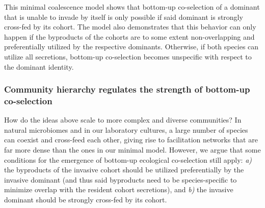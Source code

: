 \documentclass[a4paper,10pt]{article}
\begin{document}
This minimal coalescence model shows that
bottom-up co-selection of a dominant that is unable to invade by itself
is only possible if said dominant is strongly cross-fed by its cohort.
The model also demonstrates that this behavior can only happen
if the byproducts of the cohorts are to some extent non-overlapping
and preferentially utilized by the respective dominants.
Otherwise, if both species can utilize all secretions, bottom-up
co-selection becomes unspecific with respect to the dominant identity.

\subsubsection*{Community hierarchy regulates the strength of bottom-up co-selection}

How do the ideas above scale to more complex and diverse communities?
In natural microbiomes and in our laboratory cultures,
a large number of species can coexist and cross-feed each other,
giving rise to facilitation networks that are far more dense
than the ones in our minimal model.
However, we argue that some conditions
for the emergence of bottom-up ecological co-selection still apply:
\textit{a)} the byproducts of the invasive cohort should be utilized preferentially
by the invasive dominant (and thus said byproducts need to be species-specific
to minimize overlap with the resident cohort secretions),
and \textit{b)} the invasive dominant should be strongly cross-fed by its cohort.
\end{document}
